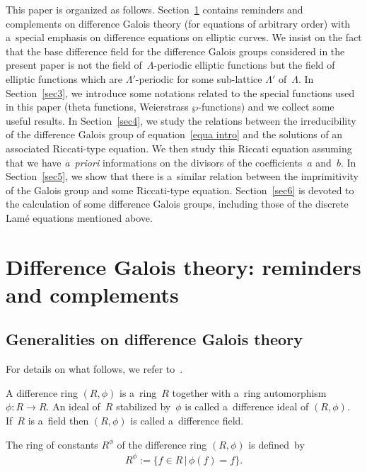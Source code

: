 \documentclass[pdftex]{sigma}
\numberwithin{equation}{section}
\begin{document}
This paper is organized as follows.
Section~\ref{sec2} contains reminders and complements on dif\/ference Galois theory (for equations of arbitrary order)
with a~special emphasis on dif\/ference equations on elliptic curves.
We insist on the fact that the base dif\/ference f\/ield for the dif\/ference Galois groups considered in the present paper is
not the f\/ield of~$\Lambda$-periodic elliptic functions but the f\/ield of elliptic functions which are $\Lambda'$-periodic
for some sub-lattice $\Lambda'$ of~$\Lambda$.
In Section~\ref{sec3}, we introduce some notations related to the special functions used in this paper (theta
functions, Weierstrass $\wp$-functions) and we collect some useful results.
In Section~\ref{sec4}, we study the relations between the irreducibility of the dif\/ference Galois group of
equation~\eqref{equa intro} and the solutions of an associated Riccati-type equation.
We then study this Riccati equation assuming that we have {\it a~priori} informations on the divisors of the
coef\/f\/icients~$a$ and~$b$.
In Section~\ref{sec5}, we show that there is a~similar relation between the imprimitivity of the Galois group and some
Riccati-type equation.
Section~\ref{sec6} is devoted to the calculation of some dif\/ference Galois groups, including those of the discrete
Lam\'e equations mentioned above.

\section{Dif\/ference Galois theory: reminders and complements}
\label{sec2}

\subsection{Generalities on dif\/ference Galois theory}

For details on what follows, we refer to~\cite[Chapter~1]{VdPS97}.

A dif\/ference ring $(R,\phi)$ is a~ring~$R$ together with a~ring automorphism $\phi: R \rightarrow R$.
An ideal of~$R$ stabilized by~$\phi$ is called a~dif\/ference ideal of $(R,\phi)$.
If~$R$ is a~f\/ield then $(R,\phi)$ is called a~dif\/ference f\/ield.

The ring of constants $R^{\phi}$ of the dif\/ference ring $(R,\phi)$ is def\/ined~by
\begin{gather*}
R^{\phi}:=\{f \in R \, | \, \phi(f)=f\}.
\end{gather*}
\end{document}
